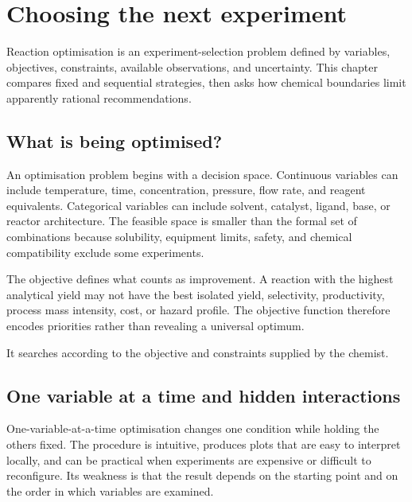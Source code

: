 
\chapter{Choosing the next experiment}

\begin{notebox}
  Reaction optimisation is an experiment-selection problem defined by variables, objectives, constraints, available observations, and uncertainty.
  This chapter compares fixed and sequential strategies, then asks how chemical boundaries limit apparently rational recommendations.
\end{notebox}

\section{What is being optimised?}

An optimisation problem begins with a decision space.
Continuous variables can include temperature, time, concentration, pressure, flow rate, and reagent equivalents.
Categorical variables can include solvent, catalyst, ligand, base, or reactor architecture.
The feasible space is smaller than the formal set of combinations because solubility, equipment limits, safety, and chemical compatibility exclude some experiments.

The objective defines what counts as improvement.
A reaction with the highest analytical yield may not have the best isolated yield, selectivity, productivity, process mass intensity, cost, or hazard profile.
The objective function therefore encodes priorities rather than revealing a universal optimum.

\begin{conceptbox}
  It searches according to the objective and constraints supplied by the chemist.
\end{conceptbox}

\section{One variable at a time and hidden interactions}

One-variable-at-a-time optimisation changes one condition while holding the others fixed.
The procedure is intuitive, produces plots that are easy to interpret locally, and can be practical when experiments are expensive or difficult to reconfigure.
Its weakness is that the result depends on the starting point and on the order in which variables are examined.

